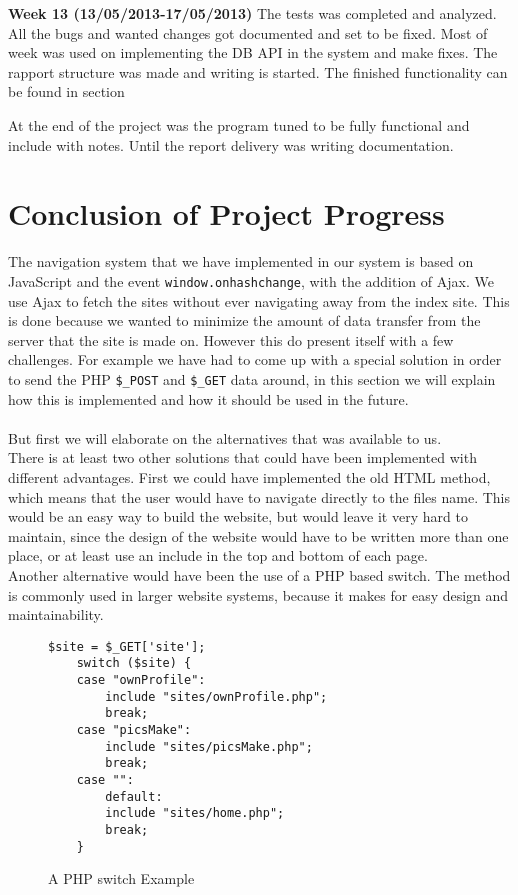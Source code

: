 \textbf{Week 13 (13/05/2013-17/05/2013)}
The tests was completed and analyzed. 
All the bugs and wanted changes got documented and set to be fixed.
Most of week was used on implementing the DB API in the system and make fixes.     
The rapport structure was made and writing is started. 
The finished functionality can be found in section    
 
At the end of the project was the program tuned to be fully functional and include with notes.
Until the report delivery was writing documentation.       

\section{Conclusion of Project Progress}
\label{sec:conclusionofProjectProgress}



The navigation system that we have implemented in our system is based on JavaScript and the event \texttt{window.onhashchange}, with the addition of Ajax.
We use Ajax to fetch the sites without ever navigating away from the index site. This is done because we wanted to minimize the amount of data transfer from the server that the site is made on. However this do present itself with a few challenges. For example we have had to come up with a special solution in order to send the PHP \texttt{\$\_POST} and \texttt{\$\_GET} data around, in this section we will explain how this is implemented and how it should be used in the future.\\
\\
But first we will elaborate on the alternatives that was available to us.\\
There is at least two other solutions that could have been implemented with different advantages. First we could have implemented the old HTML method, which means that the user would have to navigate directly to the files name. This would be an easy way to build the website, but would leave it very hard to maintain, since the design of the website would have to be written more than one place, or at least use an include in the top and bottom of each page.\\
Another alternative would have been the use of a PHP based switch. The method is commonly used in larger website systems, because it makes for easy design and maintainability.
\lstset{language=PHP}
\begin{figure}[htbp]
\begin{lstlisting}[firstline=1]
	$site = $_GET['site'];
	switch ($site) {
    case "ownProfile":
        include "sites/ownProfile.php";
        break;
    case "picsMake":
        include "sites/picsMake.php";
        break;
    case "":
		default:
        include "sites/home.php";
        break;
	}
\end{lstlisting}
\caption{A PHP switch Example}
\label{lst:phpSwitch}
\end{figure}

